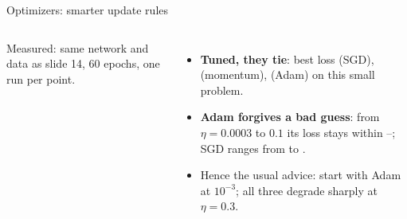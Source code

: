 \documentclass[aspectratio=169,10pt]{beamer}
\begin{document}
\begin{frame}{Optimizers: smarter update rules}
\begin{columns}[T,onlytextwidth]
\vspace{-0.5mm}
{\scriptsize\color{cTok}Measured: same network and data as slide 14, 60 epochs, one run per point.}

\raggedright\vspace{1mm}
{\footnotesize
\begin{itemize}
  \item \textbf{Tuned, they tie}: best loss \optSgdVal{} (SGD), \optMomentumVal{} (momentum),
        \optAdamVal{} (Adam) on this small problem.
  \item \textbf{Adam forgives a bad guess}: from $\eta=0.0003$ to $0.1$ its loss stays within
        \optAdamVal--\optAdamWorst; SGD ranges from \optSgdVal{} to \optSgdWorst.
  \item Hence the usual advice: start with Adam at $10^{-3}$; all three degrade sharply at $\eta=0.3$.
\end{itemize}}
\end{columns}
\end{frame}
\end{document}
